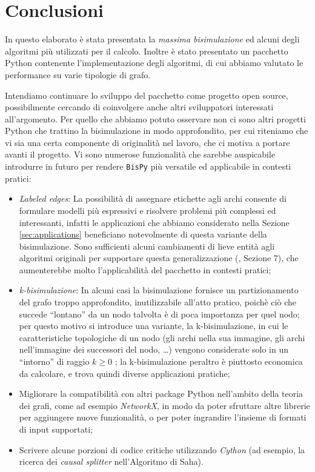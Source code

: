 \section*{Conclusioni}
\label{sec:conclusions}

In questo elaborato è stata presentata la \emph{massima bisimulazione} ed alcuni degli algoritmi più utilizzati per il calcolo. Inoltre è stato presentato un pacchetto Python contenente l'implementazione degli algoritmi, di cui abbiamo valutato le performance su varie tipologie di grafo.

Intendiamo continuare lo sviluppo del pacchetto come progetto open source, possibilmente cercando di coinvolgere anche altri sviluppatori interessati all'argomento. Per quello che abbiamo potuto osservare non ci sono altri progetti Python che trattino la bisimulazione in modo approfondito, per cui riteniamo che vi sia una certa componente di originalità nel lavoro, che ci motiva a portare avanti il progetto. Vi sono numerose funzionalità che sarebbe auspicabile introdurre in futuro per rendere \texttt{BisPy} più versatile ed applicabile in contesti pratici:
\begin{itemize}
    \item \emph{Labeled edges}: La possibilità di assegnare etichette agli archi consente di formulare modelli più espressivi e risolvere problemi più complessi ed interessanti, infatti le applicazioni che abbiamo considerato nella Sezione \ref{sec:applications} beneficiano notevolmente di questa variante della bisimulazione. Sono sufficienti alcuni cambiamenti di lieve entità agli algoritmi originali per supportare questa generalizzazione (\cite{dovier}, Sezione 7), che aumenterebbe molto l'applicabilità del pacchetto in contesti pratici;
    \item \emph{k-bisimulazione}: In alcuni casi la bisimulazione fornisce un partizionamento del grafo troppo approfondito, inutilizzabile all'atto pratico, poichè ciò che succede ``lontano'' da un nodo talvolta è di poca importanza per quel nodo; per questo motivo si introduce una variante, la k-bisimulazione, in cui le caratteristiche topologiche di un nodo (gli archi nella sua immagine, gli archi nell'immagine dei successori del nodo, \dots) vengono considerate solo in un ``intorno'' di raggio $k \geq 0$ \cite{kbisi}; la k-bisimulazione peraltro è piuttosto economica da calcolare, e trova quindi diverse applicazioni pratiche;
    \item Migliorare la compatibilità con altri package Python nell'ambito della teoria dei grafi, come ad esempio \emph{NetworkX}, in modo da poter sfruttare altre librerie per aggiungere nuove funzionalità, o per poter ingrandire l'insieme di formati di input supportati;
    \item Scrivere alcune porzioni di codice critiche utilizzando \emph{Cython} (ad esempio, la ricerca dei \emph{causal splitter} nell'Algoritmo di Saha).
\end{itemize}

